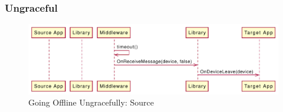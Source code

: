\subsubsection{Ungraceful}
\begin{figure}
    \includegraphics[width=\linewidth]{../figures/Going-Offline-Ungraceful-Source}
    \centering
    \caption{Going Offline Ungracefully: Source}
    \label{fig:Going-Offline-Ungraceful-Source}
\end{figure}